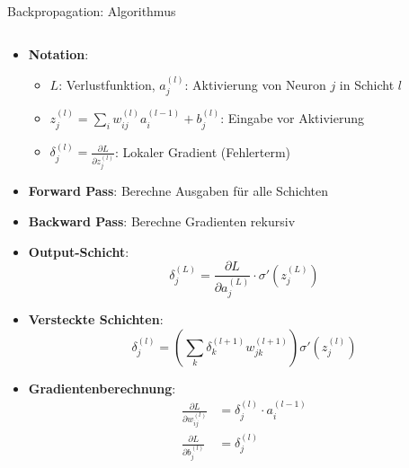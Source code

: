 \documentclass[aspectratio=1610, xcolor=dvipsnames, 9pt]{beamer}
\begin{document}
      \begin{frame}{Backpropagation: Algorithmus}
        \begin{columns}
          \begin{column}{1\textwidth}
            \begin{itemize}
              \item \textbf{Notation}: 
              \begin{itemize}
                \item $L$: Verlustfunktion, $a_j^{(l)}$: Aktivierung von Neuron $j$ in Schicht $l$
                \item $z_j^{(l)} = \sum_i w_{ij}^{(l)} a_i^{(l-1)} + b_j^{(l)}$: Eingabe vor Aktivierung
                \item $\delta_j^{(l)} = \frac{\partial L}{\partial z_j^{(l)}}$: Lokaler Gradient (Fehlerterm)
              \end{itemize}
              \item \textbf{Forward Pass}: Berechne Ausgaben für alle Schichten
              \item \textbf{Backward Pass}: Berechne Gradienten rekursiv
              \item \textbf{Output-Schicht}:
              \begin{equation}
                \delta_j^{(L)} = \frac{\partial L}{\partial a_j^{(L)}} \cdot \sigma'(z_j^{(L)})
              \end{equation}
              \item \textbf{Versteckte Schichten}:
              \begin{equation}
                \delta_j^{(l)} = \left(\sum_{k} \delta_k^{(l+1)} w_{jk}^{(l+1)}\right) \sigma'(z_j^{(l)})
              \end{equation}
              \item \textbf{Gradientenberechnung}:
              \begin{align}
                \frac{\partial L}{\partial w_{ij}^{(l)}} &= \delta_j^{(l)} \cdot a_i^{(l-1)} \\
                \frac{\partial L}{\partial b_j^{(l)}} &= \delta_j^{(l)}
              \end{align}
            \end{itemize}
          \end{column}
        \end{columns}
      \end{frame}
\end{document}
